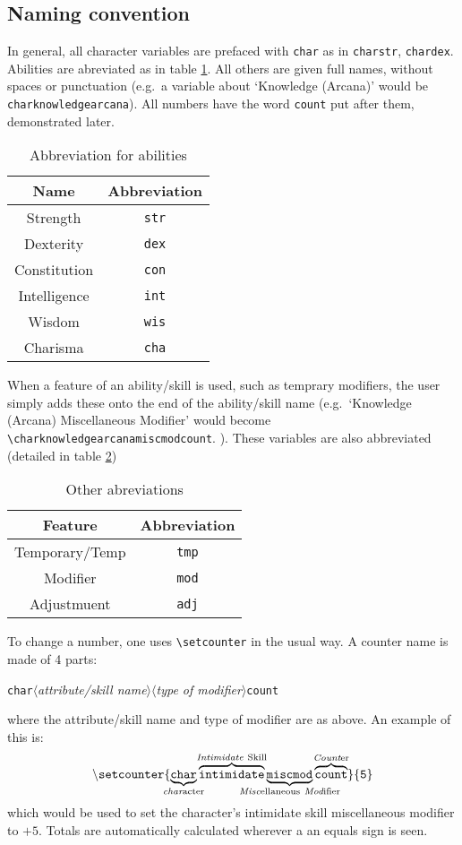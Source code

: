 \documentclass[oneside]{article}
\begin{document}
\subsection{Naming convention}
\label{sec:naming-convention}

In general, all character variables are prefaced with \verb=char= as in \verb=charstr=, \verb=chardex=. Abilities are abreviated as in table \ref{tab:abbrev}. All others are given full names, without spaces or punctuation (e.g.\ a variable about `Knowledge (Arcana)' would be \verb=charknowledgearcana=). All numbers have the word \verb=count= put after them, demonstrated later.

\begin{table}[h]
  \centering
  \begin{tabular}{c c }
    Name & Abbreviation\\\hline
    Strength & \verb=str=\\
    Dexterity & \verb=dex=\\
    Constitution & \verb=con=\\
    Intelligence & \verb=int=\\
    Wisdom & \verb=wis=\\
    Charisma & \verb=cha=\\\hline
  \end{tabular}
  \caption{Abbreviation for abilities}
  \label{tab:abbrev}
\end{table}

When a feature of an ability/skill is used, such as temprary modifiers, the user simply adds these onto the end of the ability/skill name (e.g.\ `Knowledge (Arcana) Miscellaneous Modifier' would become \verb=\charknowledgearcanamiscmodcount=. ). These variables are also abbreviated (detailed in table \ref{tab:otherabbrev})

\begin{table}[h]
  \centering
  \begin{tabular}{c c }
    Feature & Abbreviation \\\hline
    Temporary/Temp & \verb=tmp=\\
    Modifier & \verb=mod=\\
    Adjustmuent & \verb=adj=\\\hline
  \end{tabular}
  \caption{Other abreviations}
  \label{tab:otherabbrev}
\end{table}

To change a number, one uses \verb=\setcounter= in the usual way. A counter name is made of 4 parts:
\protect\parbox{\linewidth}{\texttt{char}$\langle$\emph{attribute/skill name}$\rangle\langle$\emph{type of modifier}$\rangle$\texttt{count}}
where the attribute/skill name and type of modifier are as above. An example of this is:
\[
\mathtt{\backslash setcounter\{\underbrace{\mathtt{char}}_{\mathclap{\mathrm{\emph{char}acter}}}\overbrace{\mathtt{intimidate}}^{\mathclap{\mathrm{\emph{Intimidate}\ Skill}}}\underbrace{\mathtt{miscmod}}_{\mathclap{\mathrm{\emph{Misc}ellaneous\ \emph{Mod}ifier}}}\overbrace{\mathtt{count}}^{\mathclap{\mathrm{\emph{Count}er}}}\}\{5\}}
\]
which would be used to set the character's intimidate skill miscellaneous modifier to $+5$. Totals are automatically calculated wherever a an equals sign is seen.
\end{document}
